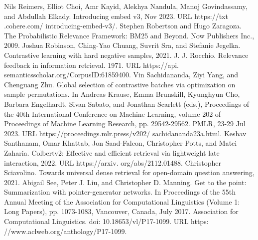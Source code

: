 Nils Reimers, Elliot Choi, Amr Kayid, Alekhya Nandula, Manoj Govindassamy, and Abdullah Elkady. Introducing embed v3, Nov 2023. URL https://txt .cohere.com/ introducing-embed-v3/.
Stephen Robertson and Hugo Zaragoza. The Probabilistic Relevance Framework: BM25 and Beyond. Now Publishers Inc., 2009.
Joshua Robinson, Ching-Yao Chuang, Suvrit Sra, and Stefanie Jegelka. Contrastive learning with hard negative samples, 2021.
J. J. Rocchio. Relevance feedback in information retrieval. 1971. URL https://api. semanticsscholar.org/CorpusID:61859400.
Vin Sachidananda, Ziyi Yang, and Chenguang Zhu. Global selection of contrastive batches via optimization on sample permutations. In Andreas Krause, Emma Brunskill, Kyunghyun Cho, Barbara Engelhardt, Sivan Sabato, and Jonathan Scarlett (eds.), Proceedings of the 40th International Conference on Machine Learning, volume 202 of Proceedings of Machine Learning Research, pp. 29542-29562. PMLR, 23-29 Jul 2023. URL https://proceedings.mlr.press/v202/ sachidananda23a.html.
Keshav Santhanam, Omar Khattab, Jon Saad-Falcon, Christopher Potts, and Matei Zaharia. Colbertv2: Effective and efficient retrieval via lightweight late interaction, 2022. URL https://arxiv. org/abs/2112.01488.
Christopher Sciavolino. Towards universal dense retrieval for open-domain question answering, 2021.
Abigail See, Peter J. Liu, and Christopher D. Manning. Get to the point: Summarization with pointer-generator networks. In Proceedings of the 55th Annual Meeting of the Association for Computational Linguistics (Volume 1: Long Papers), pp. 1073-1083, Vancouver, Canada, July 2017. Association for Computational Linguistics. doi: 10.18653/vl/P17-1099. URL https: //www.aclweb.org/anthology/P17-1099.

